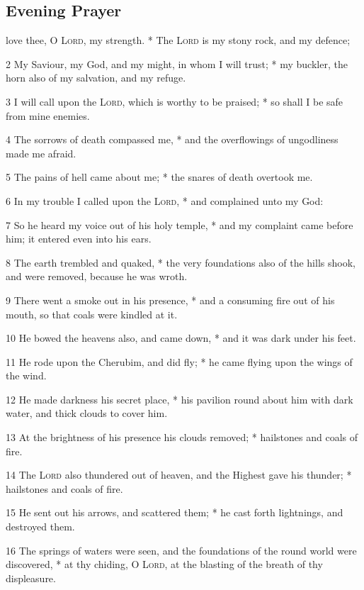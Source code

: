 \subsection{Evening Prayer}
 love thee, O {\textsc{Lord}}, my strength. * The {\textsc{Lord}} is my stony rock, and my defence;\par
2 My Saviour, my God, and my might, in whom I will trust; * my buckler, the horn also of my salvation, and my refuge.\par
3 I will call upon the {\textsc{Lord}}, which is worthy to be praised; * so shall I be safe from mine enemies.\par
4 The sorrows of death compassed me, * and the overflowings of ungodliness made me afraid.\par
5 The pains of hell came about me; * the snares of death overtook me.\par
6 In my trouble I called upon the {\textsc{Lord}}, * and complained unto my God:\par
7 So he heard my voice out of his holy temple, * and my complaint came before him; it entered even into his ears.\par
8 The earth trembled and quaked, * the very foundations also of the hills shook, and were removed, because he was wroth.\par
9 There went a smoke out in his presence, * and a consuming fire out of his mouth, so that coals were kindled at it.\par
10 He bowed the heavens also, and came down, * and it was dark under his feet.\par
11 He rode upon the Cherubim, and did fly; * he came flying upon the wings of the wind.\par
12 He made darkness his secret place, * his pavilion round about him with dark water, and thick clouds to cover him.\par
13 At the brightness of his presence his clouds removed; * hailstones and coals of fire.\par
14 The {\textsc{Lord}} also thundered out of heaven, and the Highest gave his thunder; * hailstones and coals of fire.\par
15 He sent out his arrows, and scattered them; * he cast forth lightnings, and destroyed them.\par
16 The springs of waters were seen, and the foundations of the round world were discovered, * at thy chiding, O {\textsc{Lord}}, at the blasting of the breath of thy displeasure.\par
